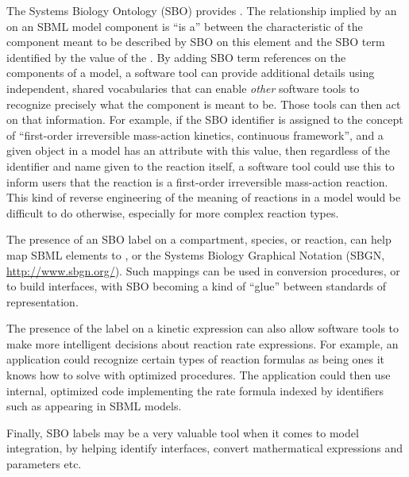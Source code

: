 The Systems Biology Ontology (SBO) provides . The relationship implied by an  on an SBML model component is ``is a'' between the characteristic of the component meant to be described by SBO on this element and the SBO term identified by the value of the . By adding SBO term
references on the components of a model, a software tool can
provide additional details using independent, shared vocabularies
that can enable \emph{other} software tools to recognize precisely
what the component is meant to be.  Those tools can then act on
that information.  For example, if the SBO identifier
 is assigned to the concept of ``first-order
irreversible mass-action kinetics, continuous framework'', and a
given \KineticLaw object in a model has an 
attribute with this value, then regardless of the
identifier and name given to the reaction itself, a software tool
could use this to inform users that the reaction is a first-order
irreversible mass-action reaction.  This kind of reverse
engineering of the meaning of reactions in a model would be
difficult to do otherwise, especially for more complex reaction
types.

The presence of an SBO label on a compartment, species, or
reaction, can help map SBML elements to , or the Systems Biology Graphical
Notation (SBGN, \url{http://www.sbgn.org/}).  Such mappings can be
used in conversion procedures, or to build interfaces, with SBO
becoming a kind of ``glue'' between standards of representation.

The presence of the label on a kinetic expression can also allow
software tools to make more intelligent decisions about reaction
rate expressions.  For example, an application could recognize
certain types of reaction formulas as being ones it
knows how to solve with optimized procedures.  The application
could then use internal, optimized code implementing the rate
formula indexed by identifiers such as 
appearing in SBML models.

Finally, SBO labels may be a very valuable tool when it comes to model integration, by helping identify interfaces, convert mathermatical expressions and parameters etc. 

